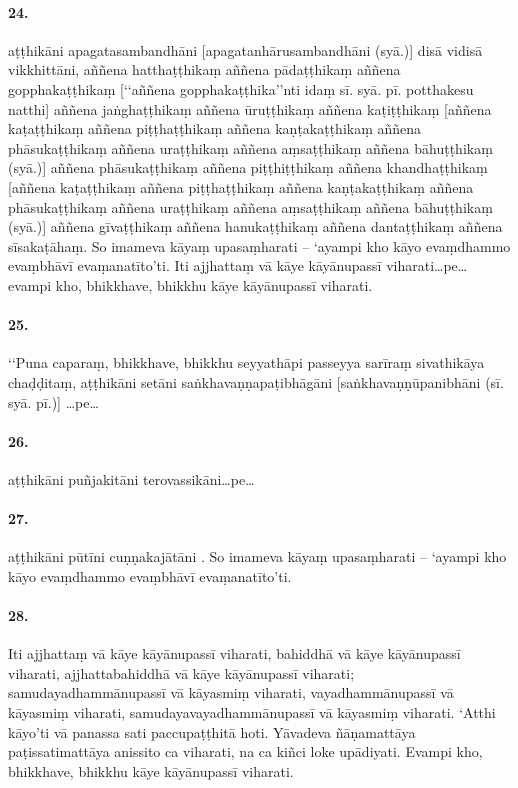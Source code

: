 \paragraph{24.} aṭṭhikāni apagatasambandhāni [apagatanhārusambandhāni (syā.)] disā vidisā vikkhittāni, aññena hatthaṭṭhikaṃ aññena pādaṭṭhikaṃ aññena gopphakaṭṭhikaṃ [‘‘aññena gopphakaṭṭhika’’nti idaṃ sī. syā. pī. potthakesu natthi] aññena jaṅghaṭṭhikaṃ aññena ūruṭṭhikaṃ aññena kaṭiṭṭhikaṃ [aññena kaṭaṭṭhikaṃ aññena piṭṭhaṭṭhikaṃ aññena kaṇṭakaṭṭhikaṃ aññena phāsukaṭṭhikaṃ aññena uraṭṭhikaṃ aññena aṃsaṭṭhikaṃ aññena bāhuṭṭhikaṃ (syā.)] aññena phāsukaṭṭhikaṃ aññena piṭṭhiṭṭhikaṃ aññena khandhaṭṭhikaṃ [aññena kaṭaṭṭhikaṃ aññena piṭṭhaṭṭhikaṃ aññena kaṇṭakaṭṭhikaṃ aññena phāsukaṭṭhikaṃ aññena uraṭṭhikaṃ aññena aṃsaṭṭhikaṃ aññena bāhuṭṭhikaṃ (syā.)] aññena gīvaṭṭhikaṃ aññena hanukaṭṭhikaṃ aññena dantaṭṭhikaṃ aññena sīsakaṭāhaṃ. So imameva kāyaṃ upasaṃharati – ‘ayampi kho kāyo evaṃdhammo evaṃbhāvī evaṃanatīto’ti. Iti ajjhattaṃ vā kāye kāyānupassī viharati…pe… evampi kho, bhikkhave, bhikkhu kāye kāyānupassī viharati.

\paragraph{25.} ‘‘Puna caparaṃ, bhikkhave, bhikkhu seyyathāpi passeyya sarīraṃ sivathikāya chaḍḍitaṃ, aṭṭhikāni setāni saṅkhavaṇṇapaṭibhāgāni [saṅkhavaṇṇūpanibhāni (sī. syā. pī.)] …pe…

\paragraph{26.} aṭṭhikāni puñjakitāni terovassikāni…pe…

\paragraph{27.} aṭṭhikāni pūtīni cuṇṇakajātāni . So imameva kāyaṃ upasaṃharati – ‘ayampi kho kāyo evaṃdhammo evaṃbhāvī evaṃanatīto’ti.

\paragraph{28.} Iti ajjhattaṃ vā kāye kāyānupassī viharati, bahiddhā vā kāye kāyānupassī viharati, ajjhattabahiddhā vā kāye kāyānupassī viharati; samudayadhammānupassī vā kāyasmiṃ viharati, vayadhammānupassī vā kāyasmiṃ viharati, samudayavayadhammānupassī vā kāyasmiṃ viharati. ‘Atthi kāyo’ti vā panassa sati paccupaṭṭhitā hoti. Yāvadeva ñāṇamattāya paṭissatimattāya anissito ca viharati, na ca kiñci loke upādiyati. Evampi kho, bhikkhave, bhikkhu kāye kāyānupassī viharati.

